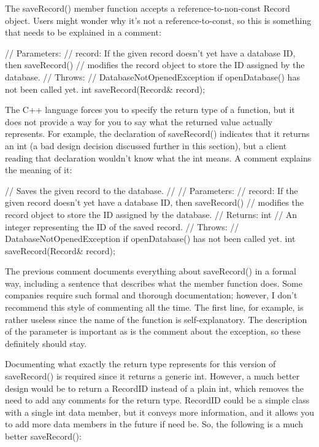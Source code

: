 The saveRecord() member function accepts a reference-to-non-const Record object. Users might wonder why it’s not a reference-to-const, so this is something that needs to be explained in a comment:

\begin{cpp}
// Parameters:
//    record: If the given record doesn't yet have a database ID, then saveRecord()
//    modifies the record object to store the ID assigned by the database.
// Throws:
//    DatabaseNotOpenedException if openDatabase() has not been called yet.
int saveRecord(Record& record);
\end{cpp}

The C++ language forces you to specify the return type of a function, but it does not provide a way for you to say what the returned value actually represents. For example, the declaration of saveRecord() indicates that it returns an int (a bad design decision discussed further in this section), but a client reading that declaration wouldn’t know what the int means. A comment explains the meaning of it:

\begin{cpp}
// Saves the given record to the database.
//
// Parameters:
//    record: If the given record doesn't yet have a database ID, then saveRecord()
//    modifies the record object to store the ID assigned by the database.
// Returns: int
//    An integer representing the ID of the saved record.
// Throws:
//    DatabaseNotOpenedException if openDatabase() has not been called yet.
int saveRecord(Record& record);
\end{cpp}

The previous comment documents everything about saveRecord() in a formal way, including a sentence that describes what the member function does. Some companies require such formal and thorough documentation; however, I don’t recommend this style of commenting all the time. The first line, for example, is rather useless since the name of the function is self-explanatory. The description of the parameter is important as is the comment about the exception, so these definitely should stay.

Documenting what exactly the return type represents for this version of saveRecord() is required since it returns a generic int. However, a much better design would be to return a RecordID instead of a plain int, which removes the need to add any comments for the return type. RecordID could be a simple class with a single int data member, but it conveys more information, and it allows you to add more data members in the future if need be. So, the following is a much better saveRecord():

